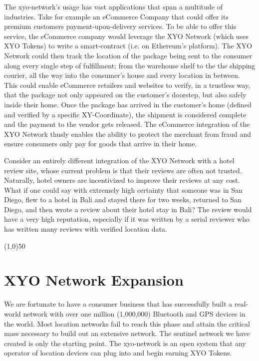 \documentclass{article}
\begin{document}
The \Gls{xyo-network}'s usage has vast applications that span a multitude of industries. Take for example an eCommerce Company that could offer its premium customers payment-upon-delivery services. To be able to offer this service, the eCommerce company would leverage the XYO Network (which uses XYO Tokens) to write a \gls{smart-contract} (i.e. on Ethereum's platform). The XYO Network could then track the location of the package being sent to the consumer along every single step of fulfillment; from the warehouse shelf to the the shipping courier, all the way into the consumer's house and every location in between. This could enable eCommerce retailers and websites to verify, in a \gls{trustless} way, that the package not only appeared on the customer's doorstep, but also safely inside their home. Once the package has arrived in the customer's home (defined and verified by a specific XY-Coordinate), the shipment is considered complete and the payment to the vendor gets released. The eCommerce integration of the XYO Network thusly enables the ability to protect the merchant from fraud and ensure consumers only pay for goods that arrive in their home.

Consider an entirely different integration of the XYO Network with a hotel review site, whose current problem is that their reviews are often not trusted. Naturally, hotel owners are incentivized to improve their reviews at any cost. What if one could say with extremely high \gls{certainty} that someone was in San Diego, flew to a hotel in Bali and stayed there for two weeks, returned to San Diego, and then wrote a review about their hotel stay in Bali? The review would have a very high reputation, especially if it was written by a serial reviewer who has written many reviews with verified location data.

\begin{center}
\line(1,0){50}
\end{center}

\section {XYO Network Expansion}
We are fortunate to have a consumer business that has successfully built a real-world network with over one million (1,000,000) Bluetooth and GPS devices in the world. Most location networks fail to reach this phase and attain the critical mass necessary to build out an extensive network. The \Gls{sentinel} network we have created is only the starting point. The \Gls{xyo-network} is an open system that any operator of location devices can plug into and begin earning XYO Tokens.
\end{document}
